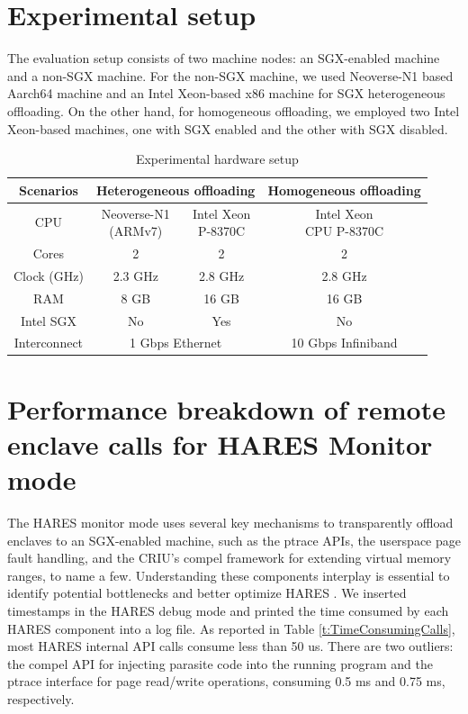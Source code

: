 \documentclass[article, doublespace,nopageskip]{VTthesis} %
\newcommand{\monitor}{HARES }
\begin{document}
    \section{Experimental setup} \label{ase:experimental setup}
    The evaluation setup consists of two machine nodes: an SGX-enabled machine and a non-SGX machine. For the non-SGX machine, we used Neoverse-N1 based Aarch64 machine and an Intel Xeon-based x86 machine for SGX heterogeneous offloading. On the other hand, for homogeneous offloading, we employed two Intel Xeon-based machines, one with SGX enabled and the other with SGX disabled. 

    \begin{table}[h]
	\centering
	\footnotesize
	\caption{Experimental hardware setup}
	\begin{tabular}{| c | c | c | c |} \hline
		Scenarios & \multicolumn{2}{|c|}{Heterogeneous offloading} & Homogeneous offloading \\ \hline \hline
		CPU & \makecell{Neoverse-N1 \\(ARMv7)} & \makecell{Intel Xeon \\P-8370C} & \makecell{Intel Xeon \\CPU P-8370C} \\ \hline
		Cores & 2 & 2 & 2 \\ \hline
		Clock (GHz) & 2.3 GHz & 2.8 GHz & 2.8 GHz \\ \hline
		RAM & 8 GB & 16 GB & 16 GB \\ \hline
		Intel SGX & No & Yes & No \\ \hline
       Interconnect & \multicolumn{2}{|c|}{1 Gbps Ethernet} & 10 Gbps Infiniband \\ \hline
	\end{tabular}
	\label{t:setup}
    \end{table}
    
    \section{Performance breakdown of remote enclave calls for \monitor Monitor mode} \label{ase:Performance breakdown of remote enclave calls}
    The \monitor monitor mode uses several key mechanisms to transparently offload enclaves to an SGX-enabled machine, such as the ptrace APIs, the userspace page fault handling, and the CRIU's compel framework for extending virtual memory ranges, to name a few. Understanding these components interplay is essential to identify potential bottlenecks and better optimize \monitor. We inserted timestamps in the \monitor debug mode and printed the time consumed by each \monitor component into a log file. As reported in Table \ref{t:TimeConsumingCalls}, most \monitor internal API calls consume less than 50 us. There are two outliers: the compel API for injecting parasite code into the running program and the ptrace interface for page read/write operations, consuming 0.5 ms and 0.75 ms, respectively.
\end{document}
